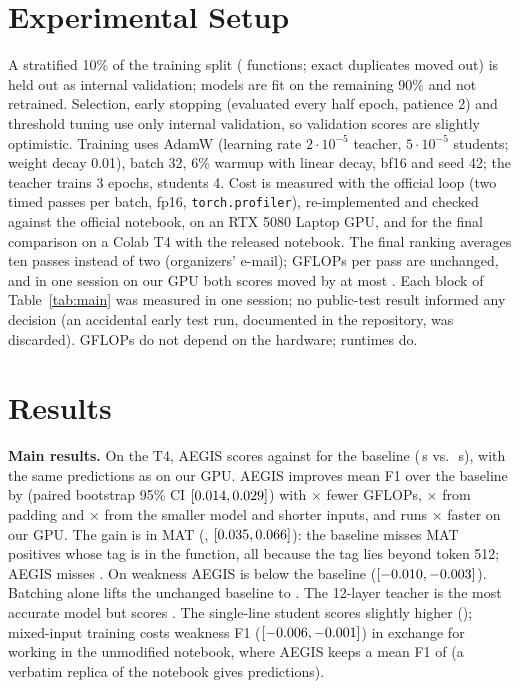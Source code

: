 \documentclass[10pt,conference]{IEEEtran}
\newcommand{\ci}[1]{\mbox{$#1$}}
\begin{document}
\section{Experimental Setup}
\label{sec:setup}
A stratified 10\% of the training split (\ValN{} functions; exact duplicates moved out) is held out as internal
validation; models are fit on the remaining 90\% and not retrained. Selection, early stopping (evaluated every
half epoch, patience 2) and threshold tuning use only internal validation, so validation scores are slightly
optimistic. Training uses AdamW (learning rate $2\cdot10^{-5}$ teacher, $5\cdot10^{-5}$ students; weight decay 0.01),
batch 32, 6\% warmup with linear decay, bf16 and seed 42; the teacher trains 3 epochs, students 4. Cost is measured
with the official loop (two timed passes per batch, fp16, \texttt{torch.profiler}), re-implemented and checked
against the official notebook, on an RTX 5080 Laptop GPU, and for the final comparison on a Colab T4 with the released notebook. The final ranking averages ten passes
instead of two (organizers' e-mail); GFLOPs per pass are unchanged, and in one session on our GPU both scores
moved by at most \RepsMaxDelta. Each block of
Table~\ref{tab:main} was measured in one session;
no public-test result informed any decision (an accidental early test run, documented in the repository, was
discarded). GFLOPs do not depend on the hardware; runtimes do.

\section{Results}
\label{sec:results}


\textbf{Main results.} On the T4, AEGIS scores \TfourAegisScore{} against \TfourBaseScore{} for the baseline
(\TfourAegisRuntime\,s vs.\ \TfourBaseRuntime\,s), with the same predictions as on our GPU. AEGIS improves mean F1 over the baseline by \FinalMeanGain{} (paired bootstrap 95\% CI
\ci{\CiMeanVsBase}) with \FinalGflopsRatio$\times$ fewer GFLOPs, \PadFactor$\times$ from padding and
\ModelFactor$\times$ from the smaller model and shorter inputs, and runs \FinalRuntimeRatio$\times$ faster on our GPU.
The gain is in MAT (\FinalMatGain, \ci{\CiMatVsBase}): the baseline misses \BaseTaggedFn{} MAT positives whose
tag is in the function, all because the tag lies beyond token 512; AEGIS misses \AegisTaggedFn. On weakness AEGIS is \FinalVulnGap{} below the baseline
(\ci{\CiVulnVsBase}). Batching alone lifts the unchanged baseline to \BaseSortedScore. The 12-layer teacher is the
most accurate model but scores \TeacherTestScore. The single-line student scores slightly higher
(\SingleScore); mixed-input training costs \MixedVulnCost{} weakness F1 (\ci{\CiMixedVuln}) in exchange for
working in the unmodified notebook, where AEGIS keeps a mean F1 of \VanillaMeanFone{} (a verbatim replica of the
notebook gives \ReplicaMatches{} predictions).
\end{document}
